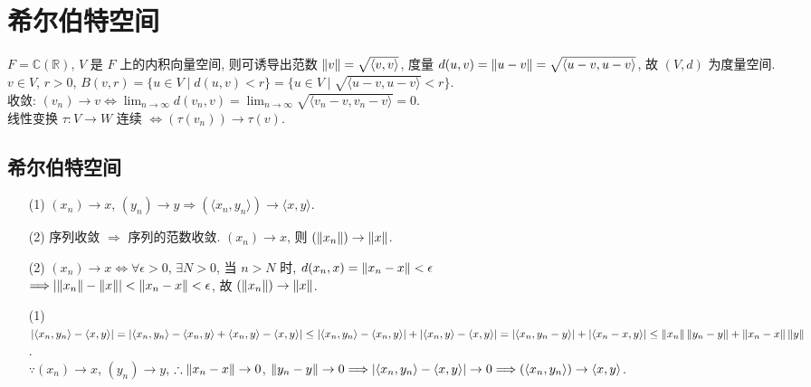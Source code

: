 \documentclass{note}
\begin{document}
\fi
\chapter{希尔伯特空间}
$F=\mathbb{C}(\mathbb{R})$, $V$ 是 $F$ 上的内积向量空间, 则可诱导出范数 $\left\lVert v\right\rVert=\sqrt{\langle v,v\rangle}$, 度量 $d(u,v)=\left\lVert u-v\right\rVert=\sqrt{\langle u-v,u-v\rangle}$, 故 $(V,d)$ 为度量空间.\\
$v\in V$, $r>0$, $B(v,r)=\{u\in V\mid d(u,v)<r\}=\{u\in V\mid\sqrt{\langle u-v,u-v\rangle}<r\}$.\\
收敛: $(v_n)\rightarrow v\Longleftrightarrow\lim_{n\rightarrow\infty}d(v_n,v)=\lim_{n\rightarrow\infty}\sqrt{\langle v_n-v,v_n-v\rangle}=0$.\\
线性变换 $\tau:V\rightarrow W$ 连续 $\Longleftrightarrow(\tau(v_n))\rightarrow\tau(v)$.

\section{希尔伯特空间}
\begin{thm}[(课本定理 13.5)]
    \begin{itemize}
        \item[(1)] $(x_n)\rightarrow x$, $(y_n)\rightarrow y\Longrightarrow(\langle x_n,y_n\rangle)\rightarrow\langle x,y\rangle$.
        \item[(2)] 序列收敛 $\Longrightarrow$ 序列的范数收敛. $(x_n)\rightarrow x$, 则 $(\left\lVert x_n\right\rVert)\rightarrow\left\lVert x\right\rVert$.
    \end{itemize}
\end{thm}
\begin{pf}
    \begin{itemize}
        \item[(2)] $(x_n)\rightarrow x\Longleftrightarrow\forall\epsilon>0$, $\exists N>0$, 当 $n>N$ 时, $d(x_n,x)=\left\lVert x_n-x\right\rVert<\epsilon$\\
        $\Longrightarrow\left\lvert\left\lVert x_n\right\rVert-\left\lVert x\right\rVert\right\rvert<\left\lVert x_n-x\right\rVert<\epsilon$, 故 $(\left\lVert x_n\right\rVert)\rightarrow\left\lVert x\right\rVert$.
        \item[(1)] $\left\lvert\langle x_n,y_n\rangle-\langle x,y\rangle\right\rvert=\left\lvert\langle x_n,y_n\rangle-\langle x_n,y\rangle+\langle x_n,y\rangle-\langle x,y\rangle\right\rvert\leq\left\lvert\langle x_n,y_n\rangle-\langle x_n,y\rangle\right\rvert+\left\lvert\langle x_n,y\rangle-\langle x,y\rangle\right\rvert=\left\lvert\langle x_n,y_n-y\rangle\right\rvert+\left\lvert\langle x_n-x,y\rangle\right\rvert\leq\left\lVert x_n\right\rVert\left\lVert y_n-y\right\rVert+\left\lVert x_n-x\right\rVert\left\lVert y\right\rVert$.\\
        $\because(x_n)\rightarrow x$, $(y_n)\rightarrow y$, $\therefore\left\lVert x_n-x\right\rVert\rightarrow 0$, $\left\lVert y_n-y\right\rVert\rightarrow 0\Longrightarrow\left\lvert\langle x_n,y_n\rangle-\langle x,y\rangle\right\rvert\rightarrow 0\Longrightarrow(\langle x_n,y_n\rangle)\rightarrow\langle x,y\rangle$.
    \end{itemize}
\end{pf}
\end{document}
